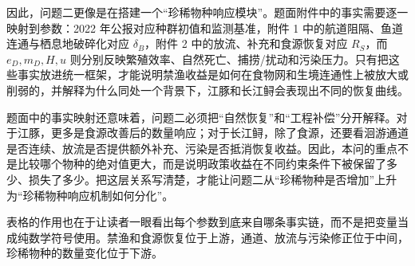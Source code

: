 因此，问题二更像是在搭建一个“珍稀物种响应模块”。题面附件中的事实需要逐一映射到参数：2022 年公报对应种群初值和监测基准，附件 1 中的航道阻隔、鱼道连通与栖息地破碎化对应 \(\delta_B\)，附件 2 中的放流、补充和食源恢复对应 \(R_S\)，而 \(e_D,m_D,H,u\) 则分别反映繁殖效率、自然死亡、捕捞/扰动和污染压力。只有把这些事实放进统一框架，才能说明禁渔收益是如何在食物网和生境连通性上被放大或削弱的，并解释为什么同处一个背景下，江豚和长江鲟会表现出不同的恢复曲线\cite{report2022}。

题面中的事实映射还意味着，问题二必须把“自然恢复”和“工程补偿”分开解释。对于江豚，更多是食源改善后的数量响应；对于长江鲟，除了食源，还要看洄游通道是否连续、放流是否提供额外补充、污染是否抵消恢复收益。因此，本问的重点不是比较哪个物种的绝对值更大，而是说明政策收益在不同约束条件下被保留了多少、损失了多少。把这层关系写清楚，才能让问题二从“珍稀物种是否增加”上升为“珍稀物种响应机制如何分化”。

表格的作用也在于让读者一眼看出每个参数到底来自哪条事实链，而不是把变量当成纯数学符号使用。禁渔和食源恢复位于上游，通道、放流与污染修正位于中间，珍稀物种的数量变化位于下游。
